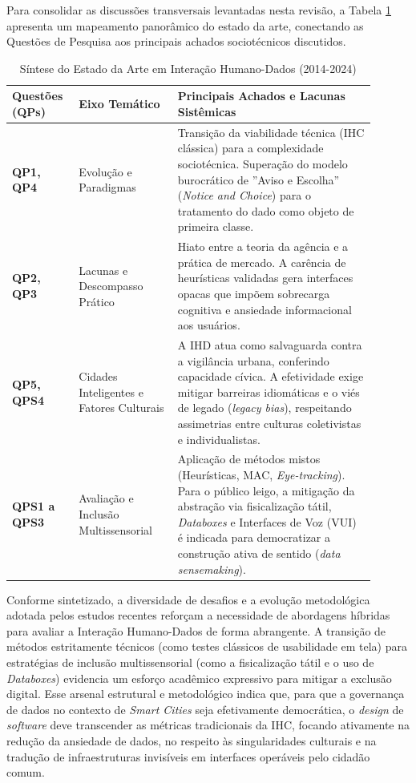 \documentclass[12pt]{article}
\begin{document}
    Para consolidar as discussões transversais levantadas nesta revisão, a Tabela \ref{tab:sintese_geral} apresenta um mapeamento panorâmico do estado da arte, conectando as Questões de Pesquisa aos principais achados sociotécnicos discutidos.

\begin{table}[H]
\centering
\caption{Síntese do Estado da Arte em Interação Humano-Dados (2014-2024)}
\label{tab:sintese_geral}
\small
\begin{tabular}{p{0.15\linewidth} p{0.25\linewidth} p{0.50\linewidth}}
\hline
\textbf{Questões (QPs)} & \textbf{Eixo Temático} & \textbf{Principais Achados e Lacunas Sistêmicas} \\ \hline
\textbf{QP1, QP4} & Evolução e Paradigmas & Transição da viabilidade técnica (IHC clássica) para a complexidade sociotécnica. Superação do modelo burocrático de ''Aviso e Escolha'' (\textit{Notice and Choice}) para o tratamento do dado como objeto de primeira classe. \\ \hline
\textbf{QP2, QP3} & Lacunas e Descompasso Prático & Hiato entre a teoria da agência e a prática de mercado. A carência de heurísticas validadas gera interfaces opacas que impõem sobrecarga cognitiva e ansiedade informacional aos usuários. \\ \hline
\textbf{QP5, QPS4} & Cidades Inteligentes e Fatores Culturais & A IHD atua como salvaguarda contra a vigilância urbana, conferindo capacidade cívica. A efetividade exige mitigar barreiras idiomáticas e o viés de legado (\textit{legacy bias}), respeitando assimetrias entre culturas coletivistas e individualistas. \\ \hline
\textbf{QPS1 a QPS3} & Avaliação e Inclusão Multissensorial & Aplicação de métodos mistos (Heurísticas, MAC, \textit{Eye-tracking}). Para o público leigo, a mitigação da abstração via fisicalização tátil, \textit{Databoxes} e Interfaces de Voz (VUI) é indicada para democratizar a construção ativa de sentido (\textit{data sensemaking}). \\ \hline
\end{tabular}
\end{table}

    Conforme sintetizado, a diversidade de desafios e a evolução metodológica adotada pelos estudos recentes reforçam a necessidade de abordagens híbridas para avaliar a Interação Humano-Dados de forma abrangente. A transição de métodos estritamente técnicos (como testes clássicos de usabilidade em tela) para estratégias de inclusão multissensorial (como a fisicalização tátil e o uso de \textit{Databoxes}) evidencia um esforço acadêmico expressivo para mitigar a exclusão digital. Esse arsenal estrutural e metodológico indica que, para que a governança de dados no contexto de \textit{Smart Cities} seja efetivamente democrática, o \textit{design} de \textit{software} deve transcender as métricas tradicionais da IHC, focando ativamente na redução da ansiedade de dados, no respeito às singularidades culturais e na tradução de infraestruturas invisíveis em interfaces operáveis pelo cidadão comum.
\end{document}
